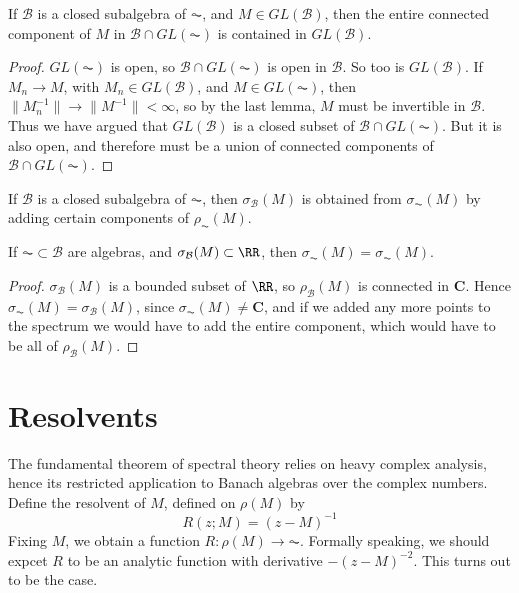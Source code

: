\begin{theorem}
    If $\mathcal{B}$ is a closed subalgebra of $\AC$, and $M \in GL(\mathcal{B})$, then the entire connected component of $M$ in $\mathcal{B} \cap GL(\AC)$ is contained in $GL(\mathcal{B})$.
\end{theorem}
\begin{proof}
    $GL(\AC)$ is open, so $\mathcal{B} \cap GL(\AC)$ is open in $\mathcal{B}$. So too is $GL(\mathcal{B})$. If $M_n \to M$, with $M_n \in GL(\mathcal{B})$, and $M \in GL(\AC)$, then $\| M_n^{-1} \| \to \| M^{-1} \| < \infty$, so by the last lemma, $M$ must be invertible in $\mathcal{B}$. Thus we have argued that $GL(\mathcal{B})$ is a closed subset of $\mathcal{B} \cap GL(\AC)$. But it is also open, and therefore must be a union of connected components of $\mathcal{B} \cap GL(\AC)$.
\end{proof}

\begin{corollary}
    If $\mathcal{B}$ is a closed subalgebra of $\AC$, then $\sigma_{\mathcal{B}}(M)$ is obtained from $\sigma_{\AC}(M)$ by adding certain components of $\rho_{\AC}(M)$.
\end{corollary}

\begin{corollary}
    If $\AC \subset \mathcal{B}$ are algebras, and $\sigma_{\mathcal{B}}(M) \subset \RR$, then $\sigma_{\AC}(M) = \sigma_{\AC}(M)$.
\end{corollary}
\begin{proof}
    $\sigma_{\mathcal{B}}(M)$ is a bounded subset of $\RR$, so $\rho_{\mathcal{B}}(M)$ is connected in $\mathbf{C}$. Hence $\sigma_{\AC}(M) = \sigma_{\mathcal{B}}(M)$, since $\sigma_{\AC}(M) \neq \mathbf{C}$, and if we added any more points to the spectrum we would have to add the entire component, which would have to be all of $\rho_{\mathcal{B}}(M)$.
\end{proof}

\section{Resolvents}

The fundamental theorem of spectral theory relies on heavy complex analysis, hence its restricted application to Banach algebras over the complex numbers. Define the resolvent of $M$, defined on $\rho(M)$ by
%
\[ R(z; M) = (z - M)^{-1} \]
%
Fixing $M$, we obtain a function $R: \rho(M) \to \AC$. Formally speaking, we should expcet $R$ to be an analytic function with derivative $-(z - M)^{-2}$. This turns out to be the case.

